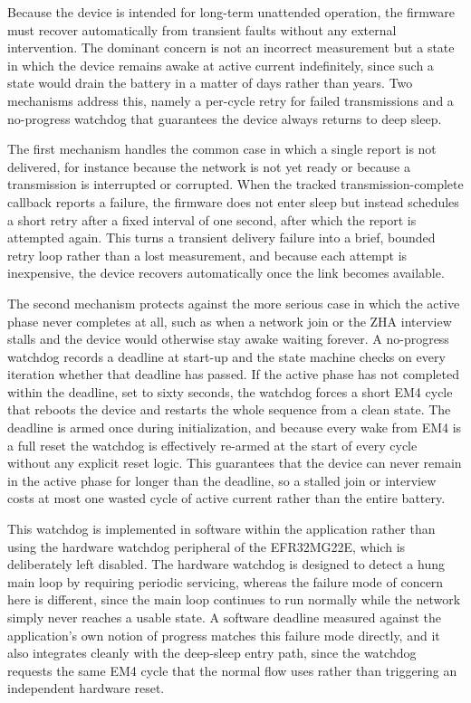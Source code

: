 Because the device is intended for long-term unattended operation, the firmware must recover automatically from transient faults without any external intervention.
The dominant concern is not an incorrect measurement but a state in which the device remains awake at active current indefinitely, since such a state would drain the battery in a matter of days rather than years.
Two mechanisms address this, namely a per-cycle retry for failed transmissions and a no-progress watchdog that guarantees the device always returns to deep sleep.

The first mechanism handles the common case in which a single report is not delivered, for instance because the network is not yet ready or because a transmission is interrupted or corrupted.
When the tracked transmission-complete callback reports a failure, the firmware does not enter sleep but instead schedules a short retry after a fixed interval of one second, after which the report is attempted again.
This turns a transient delivery failure into a brief, bounded retry loop rather than a lost measurement, and because each attempt is inexpensive, the device recovers automatically once the link becomes available.

The second mechanism protects against the more serious case in which the active phase never completes at all, such as when a network join or the ZHA interview stalls and the device would otherwise stay awake waiting forever.
A no-progress watchdog records a deadline at start-up and the state machine checks on every iteration whether that deadline has passed.
If the active phase has not completed within the deadline, set to sixty seconds, the watchdog forces a short EM4 cycle that reboots the device and restarts the whole sequence from a clean state.
The deadline is armed once during initialization, and because every wake from EM4 is a full reset the watchdog is effectively re-armed at the start of every cycle without any explicit reset logic.
This guarantees that the device can never remain in the active phase for longer than the deadline, so a stalled join or interview costs at most one wasted cycle of active current rather than the entire battery.

This watchdog is implemented in software within the application rather than using the hardware watchdog peripheral of the EFR32MG22E, which is deliberately left disabled.
The hardware watchdog is designed to detect a hung main loop by requiring periodic servicing, whereas the failure mode of concern here is different, since the main loop continues to run normally while the network simply never reaches a usable state.
A software deadline measured against the application's own notion of progress matches this failure mode directly, and it also integrates cleanly with the deep-sleep entry path, since the watchdog requests the same EM4 cycle that the normal flow uses rather than triggering an independent hardware reset.

